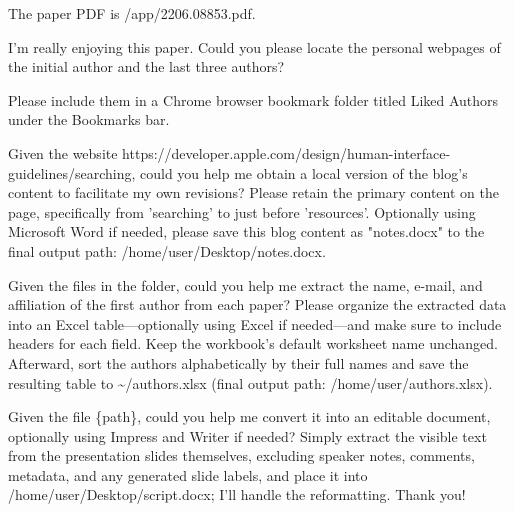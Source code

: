 \begin{instructionbox}
The paper PDF is \textasciigrave{}/app/2206.08853.pdf\textasciigrave{}.

I'm really enjoying this paper. Could you please locate the personal webpages of the initial author and the last three authors?

Please include them in a Chrome browser bookmark folder titled \textasciigrave{}Liked Authors\textasciigrave{} under the \textasciigrave{}Bookmarks bar\textasciigrave{}.
\end{instructionbox}

\begin{instructionbox}
Given the website \textasciigrave{}https://developer.apple.com/design/human-interface-guidelines/searching\textasciigrave{}, could you help me obtain a local version of the blog's content to facilitate my own revisions? Please retain the primary content on the page, specifically from 'searching' to just before 'resources'. Optionally using Microsoft Word if needed, please save this blog content as "notes.docx" to the final output path: \textasciigrave{}/home/user/Desktop/notes.docx\textasciigrave{}.
\end{instructionbox}

\begin{instructionbox}
Given the files in the folder, could you help me extract the name, e-mail, and affiliation of the first author from each paper? Please organize the extracted data into an Excel table---optionally using Excel if needed---and make sure to include headers for each field. Keep the workbook's default worksheet name unchanged. Afterward, sort the authors alphabetically by their full names and save the resulting table to \textasciigrave{}\textasciitilde{}/authors.xlsx\textasciigrave{} (final output path: \textasciigrave{}/home/user/authors.xlsx\textasciigrave{}).
\end{instructionbox}

\begin{instructionbox}
Given the file \{path\}, could you help me convert it into an editable document, optionally using Impress and Writer if needed? Simply extract the visible text from the presentation slides themselves, excluding speaker notes, comments, metadata, and any generated slide labels, and place it into \textasciigrave{}/home/user/Desktop/script.docx\textasciigrave{}; I'll handle the reformatting. Thank you!
\end{instructionbox}

